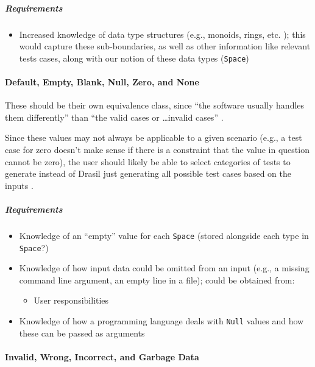 \subparagraph{Requirements}
\begin{itemize}
      \item Increased knowledge of data type structures (e.g., monoids, rings,
            etc. \citep{june_11_meeting}); this would capture these sub-boundaries,
            as well as other information like relevant tests cases, along with
            our notion of these data types (\texttt{Space})
\end{itemize}

\paragraph{Default, Empty, Blank, Null, Zero, and None
      \citep[pp.~77-78]{Patton2006}}

These should be their own equivalence class, since ``the software usually
handles them differently'' than ``the valid cases or \dots invalid cases''
\citep[p.~78]{Patton2006}.

Since these values may not always be applicable to a given scenario (e.g., a
test case for zero doesn't make sense if there is a constraint that the value
in question cannot be zero), the user should likely be able to select
categories of tests to generate instead of Drasil just generating all possible
test cases based on the inputs \citep{june_11_meeting}.

\subparagraph{Requirements}
\begin{itemize}
      \item Knowledge of an ``empty'' value for each \texttt{Space} (stored
            alongside each type in \texttt{Space}?)
      \item Knowledge of how input data could be omitted from an input
            (e.g., a missing command line argument, an empty line in a file);
            could be obtained from:
            \begin{itemize}
                  \item User responsibilities
            \end{itemize}
      \item Knowledge of how a programming language deals with \texttt{Null}
            values and how these can be passed as arguments
\end{itemize}

\paragraph{Invalid, Wrong, Incorrect, and Garbage Data
      \citep[pp.~78-79]{Patton2006}}

